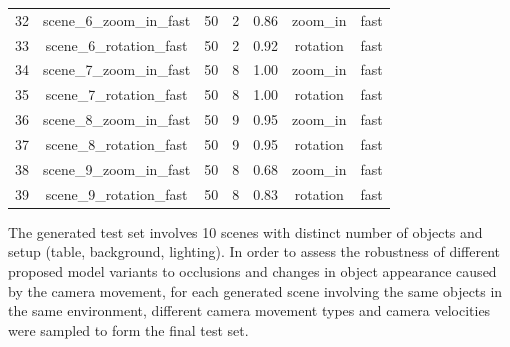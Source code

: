 \begin{table}
\begin{tabular}{|c|c|c|c|c|c|c|}
32 & scene\_6\_zoom\_in\_fast & 50                                                       & 2                                                         & 0.86                                                         & zoom\_in                                                    & fast     \\
33 & scene\_6\_rotation\_fast & 50                                                       & 2                                                         & 0.92                                                         & rotation                                                    & fast     \\
34 & scene\_7\_zoom\_in\_fast & 50                                                       & 8                                                         & 1.00                                                         & zoom\_in                                                    & fast     \\
35 & scene\_7\_rotation\_fast & 50                                                       & 8                                                         & 1.00                                                         & rotation                                                    & fast     \\
36 & scene\_8\_zoom\_in\_fast & 50                                                       & 9                                                         & 0.95                                                         & zoom\_in                                                    & fast     \\
37 & scene\_8\_rotation\_fast & 50                                                       & 9                                                         & 0.95                                                         & rotation                                                    & fast     \\
38 & scene\_9\_zoom\_in\_fast & 50                                                       & 8                                                         & 0.68                                                         & zoom\_in                                                    & fast     \\
39 & scene\_9\_rotation\_fast & 50                                                       & 8                                                         & 0.83                                                         & rotation                                                    & fast   \\
\hline
\end{tabular}
\end{table}
\newpage
The generated test set involves 10 scenes with distinct number of objects and setup (table, background, lighting). In order to assess the robustness of different proposed model variants to occlusions and changes in object appearance caused by the camera movement, for each generated scene involving the same objects in the same environment, different camera movement types and camera velocities were sampled to form the final test set. \par

